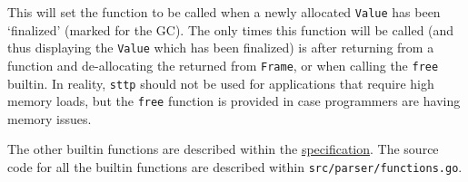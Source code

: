 This will set the function to be called when a newly allocated \verb|Value| has been `finalized' (marked for the GC). The only times this function will be called (and thus displaying the \verb|Value| which has been finalized) is after returning from a function and de-allocating the returned from \verb|Frame|, or when calling the \verb|free| builtin. In reality, \verb|sttp| should not be used for applications that require high memory loads, but the \verb|free| function is provided in case programmers are having memory issues.

The other builtin functions are described within the \hyperref[sec:builtins]{specification}. The source code for all the builtin functions are described within \verb|src/parser/functions.go|.
